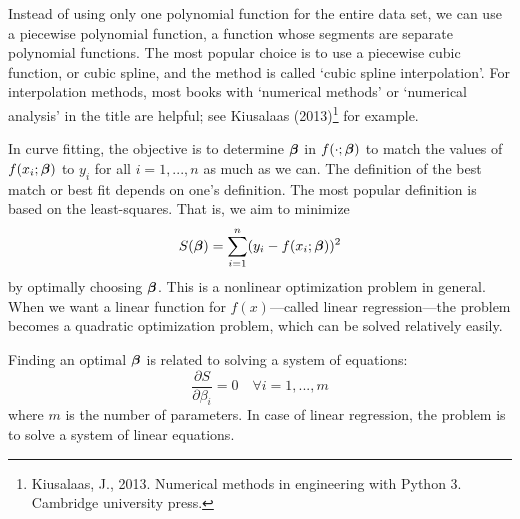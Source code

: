 Instead of using only one polynomial function for the entire data set, we can use a piecewise polynomial function, a function whose segments are separate polynomial functions. The most popular choice is to use a piecewise cubic function, or cubic spline, and the method is called `cubic spline interpolation'. For interpolation methods, most books with `numerical methods' or `numerical analysis' in the title are helpful; see Kiusalaas (2013)\footnote{Kiusalaas, J., 2013. Numerical methods in engineering with Python 3. Cambridge university press.} for example.

In curve fitting, the objective is to determine $\boldsymbol{\beta}$ in $f(\cdot; \boldsymbol{\beta})$ to match the values of $f(x_i; \boldsymbol{\beta})$ to $y_i$ for all $i=1,...,n$ as much as we can. The definition of the best match or best fit depends on one's definition. The most popular definition is based on the least-squares. That is, we aim to minimize
\[
	S(\boldsymbol{\beta}) = \sum_{i=1}^n ( y_i - f(x_i; \boldsymbol{\beta}) )^2
\]
by optimally choosing $\boldsymbol{\beta}$. This is a nonlinear optimization problem in general. When we want a linear function for $f(x)$---called linear regression---the problem becomes a quadratic optimization problem, which can be solved relatively easily.

Finding an optimal $\boldsymbol{\beta}$ is related to solving a system of equations:
\[
	\frac{\partial S}{\partial \beta_i} = 0 \quad \forall i=1,...,m
\]
where $m$ is the number of parameters. In case of linear regression, the problem is to solve a system of linear equations.


